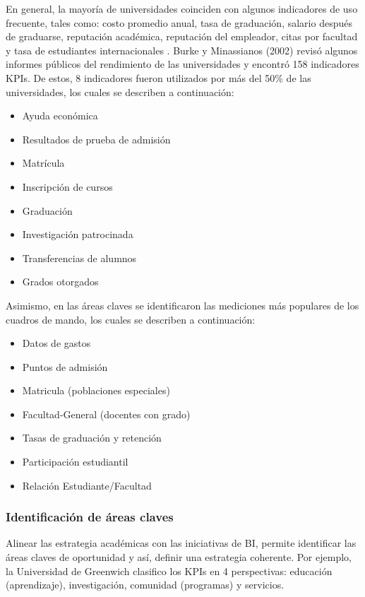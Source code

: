 \documentclass[11pt,titlepage]{report}
\begin{document}
En general, la mayoría de universidades coinciden con algunos indicadores de uso frecuente, tales como: costo promedio anual, tasa de graduación, salario después de graduarse, reputación académica, reputación del empleador, citas por facultad y tasa de estudiantes internacionales \cite{web08}. Burke y  Minassianos (2002) revisó algunos informes públicos del rendimiento de las universidades y encontró 158 indicadores KPIs. De estos, 8 indicadores fueron utilizados por más del 50\% de las universidades, los cuales se describen a continuación:

\begin{multicols}{2}
\begin{itemize}
\item Ayuda económica
\item Resultados de prueba de admisión
\item Matrícula
\item Inscripción de cursos
\item Graduación
\item Investigación patrocinada
\item Transferencias de alumnos
\item Grados otorgados
\end{itemize}
\end{multicols}

Asimismo, en las áreas claves se identificaron las mediciones más populares de los cuadros de mando, los cuales se describen a continuación:
\begin{itemize}
	\item   Datos de gastos
	\item	Puntos de admisión
	\item	Matricula (poblaciones especiales)
	\item	Facultad-General (docentes con grado)
	\item	Tasas de graduación y retención
	\item	Participación estudiantil
	\item	Relación Estudiante/Facultad\\
\end{itemize}



\subsubsection{Identificación de áreas claves}
Alinear las estrategia académicas con las iniciativas de BI, permite identificar las áreas claves de oportunidad y así, definir una estrategia coherente. Por ejemplo, la Universidad de Greenwich clasifico los KPIs en 4 perspectivas: educación (aprendizaje),  investigación, comunidad (programas) y servicios.\\
\end{document}
